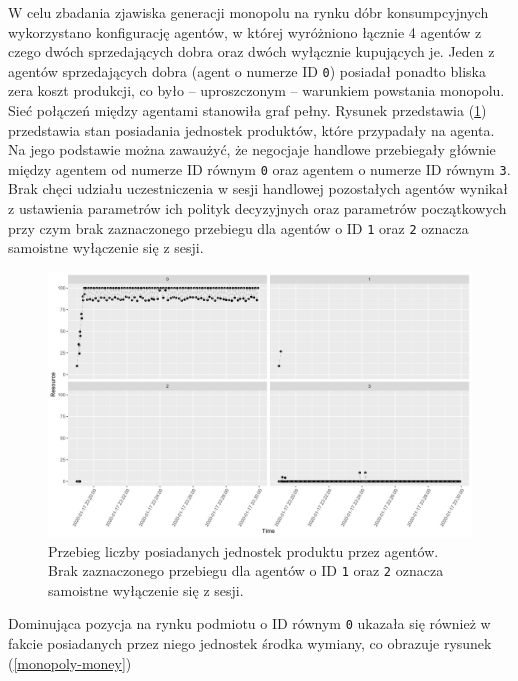 \documentclass{article}
\begin{document}
W celu zbadania zjawiska generacji monopolu na rynku dóbr konsumpcyjnych wykorzystano konfigurację agentów, w której wyróżniono łącznie 4 agentów z czego dwóch sprzedających dobra oraz dwóch wyłącznie kupujących je. 
Jeden z agentów sprzedających dobra (agent o numerze ID \texttt{0}) posiadał ponadto bliska zera koszt produkcji, co było -- uproszczonym -- warunkiem powstania monopolu. \\
Sieć połączeń między agentami stanowiła graf pełny. Rysunek przedstawia (\ref{monopoly-resource}) przedstawia stan posiadania jednostek produktów, które przypadały na agenta. Na jego podstawie można zawaużyć, że negocjaje handlowe przebiegały głównie między agentem od numerze ID równym \texttt{0} oraz agentem o numerze ID równym \texttt{3}. Brak chęci udziału uczestniczenia w sesji handlowej pozostałych agentów wynikał z ustawienia parametrów ich polityk decyzyjnych oraz parametrów początkowych przy czym brak zaznaczonego przebiegu dla agentów o ID \texttt{1} oraz \texttt{2} oznacza samoistne wyłączenie się z sesji.

\begin{figure}[H]
	\centering
	\includegraphics[width=\textwidth]{./png/monopoly-resource.png}
	\caption{Przebieg liczby posiadanych jednostek produktu przez agentów. Brak zaznaczonego przebiegu dla agentów o ID \texttt{1} oraz \texttt{2} oznacza samoistne wyłączenie się z sesji.}
	\label{monopoly-resource}
\end{figure}

Dominująca pozycja na rynku podmiotu o ID równym \texttt{0} ukazała się również w fakcie posiadanych przez niego jednostek środka wymiany, co obrazuje rysunek (\ref{monopoly-money})
\end{document}
